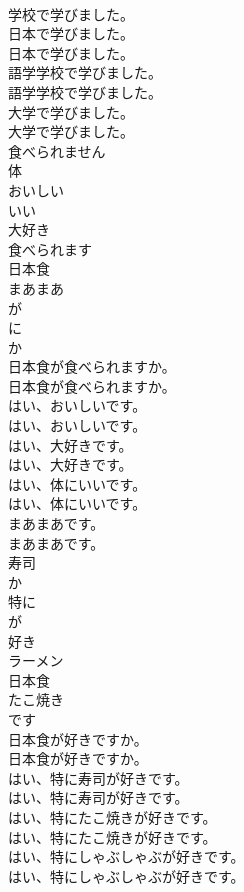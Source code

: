 \documentclass[8pt]{extreport}
\begin{document}
\begin{CJK}{UTF8}{min}
\\	学校で学びました。 
\\	日本で学びました。	
\\	日本で学びました。 
\\	語学学校で学びました。	
\\	語学学校で学びました。 
\\	大学で学びました。	
\\	大学で学びました。 
\\	食べられません
\\	体
\\	おいしい
\\	いい
\\	大好き
\\	食べられます
\\	日本食
\\	まあまあ
\\	が
\\	に
\\	か
\\	日本食が食べられますか。	
\\	日本食が食べられますか。 
\\	はい、おいしいです。	
\\	はい、おいしいです。 
\\	はい、大好きです。	
\\	はい、大好きです。 
\\	はい、体にいいです。	
\\	はい、体にいいです。 
\\	まあまあです。	
\\	まあまあです。 
\\	寿司
\\	か
\\	特に
\\	が
\\	好き
\\	ラーメン
\\	日本食
\\	たこ焼き
\\	です
\\	日本食が好きですか。	
\\	日本食が好きですか。 
\\	はい、特に寿司が好きです。	
\\	はい、特に寿司が好きです。 
\\	はい、特にたこ焼きが好きです。	
\\	はい、特にたこ焼きが好きです。 
\\	はい、特にしゃぶしゃぶが好きです。	
\\	はい、特にしゃぶしゃぶが好きです。 

\end{CJK}
\end{document}
